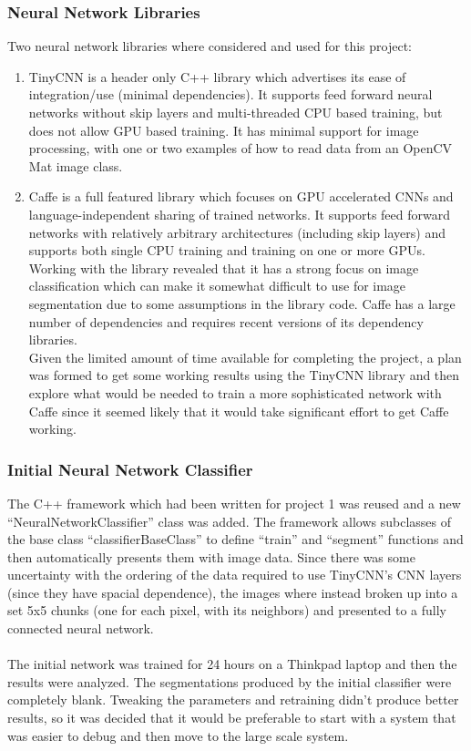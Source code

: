 \documentclass[12pt]{article}
\begin{document}
\subsubsection{Neural Network Libraries}
	Two neural network libraries where considered and used for this project:\\
\begin{enumerate}
	\item TinyCNN is a header only C++ library which advertises its ease of integration/use (minimal dependencies).  It supports feed forward neural networks without skip layers and  multi-threaded CPU based training, but does not allow GPU based training.  It has minimal support for image processing, with one or two examples of how to read data from an OpenCV Mat image class.  \\
	\item Caffe is a full featured library which focuses on GPU accelerated CNNs and language-independent sharing of trained networks.  It supports feed forward networks with relatively arbitrary architectures (including skip layers) and supports both single CPU training and training on one or more GPUs.  Working with the library revealed that it has a strong focus on image classification which can make it somewhat difficult to use for image segmentation due to some assumptions in the library code.  Caffe has a large number of dependencies and requires recent versions of its dependency libraries.\\
	Given the limited amount of time available for completing the project, a plan was formed to get some working results using the TinyCNN library and then explore what would be needed to train a more sophisticated network with Caffe since it seemed likely that it would take significant effort to get Caffe working.
\end{enumerate}
\subsubsection{Initial Neural Network Classifier}
	The C++ framework which had been written for project 1 was reused and a new “NeuralNetworkClassifier” class was added.  The framework allows subclasses of the base class “classifierBaseClass” to define “train” and “segment” functions and then automatically presents them with image data.  Since there was some uncertainty with the ordering of the data required to use TinyCNN's CNN layers (since they have spacial dependence), the images where instead broken up into a set 5x5 chunks (one for each pixel, with its neighbors) and presented to a fully connected neural network.\\
\\
	The initial network was trained for 24 hours on a Thinkpad laptop and then the results were analyzed.  The segmentations produced by the initial classifier were completely blank.  Tweaking the parameters and retraining didn't produce better results, so it was decided that it would be preferable to start with a system that was easier to debug and then move to the large scale system.
\end{document}
